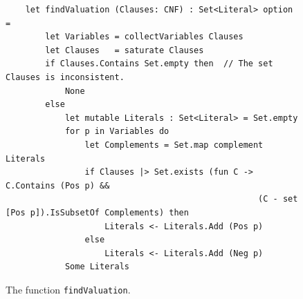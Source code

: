 \begin{figure}[!ht]
\centering
\begin{verbatim}
    let findValuation (Clauses: CNF) : Set<Literal> option =
        let Variables = collectVariables Clauses
        let Clauses   = saturate Clauses
        if Clauses.Contains Set.empty then  // The set Clauses is inconsistent.
            None
        else
            let mutable Literals : Set<Literal> = Set.empty
            for p in Variables do
                let Complements = Set.map complement Literals
                if Clauses |> Set.exists (fun C -> C.Contains (Pos p) && 
                                                   (C - set [Pos p]).IsSubsetOf Complements) then
                    Literals <- Literals.Add (Pos p)
                else
                    Literals <- Literals.Add (Neg p)
            Some Literals
\end{verbatim}
\vspace*{-0.3cm}
\caption{The function \texttt{findValuation}.}
\label{fig:Completeness.ipynb-3}
\end{figure}

\FloatBarrier

